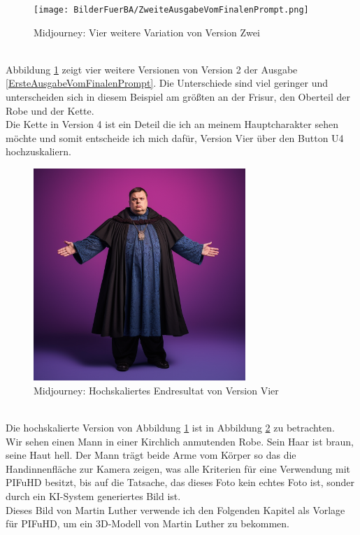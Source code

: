 \begin{figure}
	\centering
	\texttt{[image: BilderFuerBA/ZweiteAusgabeVomFinalenPrompt.png]}
	\caption{Midjourney: Vier weitere Variation von Version Zwei}
	\label{ZweiteAusgabeVomFinalenPrompt}
\end{figure}
\\
Abbildung \ref{ZweiteAusgabeVomFinalenPrompt} zeigt vier weitere Versionen von Version 2 der Ausgabe \ref{ErsteAusgabeVomFinalenPrompt}. Die Unterschiede sind viel geringer und unterscheiden sich in diesem Beispiel am größten an der Frisur, den Oberteil der Robe und der Kette.
\\
Die Kette in Version 4 ist ein Deteil die ich an meinem Hauptcharakter sehen möchte und somit entscheide ich mich dafür, Version Vier über den Button U4 hochzuskaliern.
\begin{figure}
	\centering
	\includegraphics[width=8.022cm]{BilderFuerBA/DritteAusgabeVomFinalenPrompt.png}
	\caption{Midjourney: Hochskaliertes Endresultat von Version Vier}
	\label{DritteAusgabeVomFinalenPrompt}
\end{figure}
\\
Die hochskalierte Version von Abbildung \ref{ZweiteAusgabeVomFinalenPrompt} ist in Abbildung \ref{DritteAusgabeVomFinalenPrompt} zu betrachten.
\\
Wir sehen einen Mann in einer Kirchlich anmutenden Robe. Sein Haar ist braun, seine Haut hell. Der Mann trägt beide Arme vom Körper so das die Handinnenfläche zur Kamera zeigen, was alle Kriterien für eine Verwendung mit PIFuHD besitzt, bis auf die Tatsache, das dieses Foto kein echtes Foto ist, sonder durch ein KI-System generiertes Bild ist.
\\
Dieses Bild von Martin Luther verwende ich den Folgenden Kapitel als Vorlage für PIFuHD, um ein 3D-Modell von Martin Luther zu bekommen.
